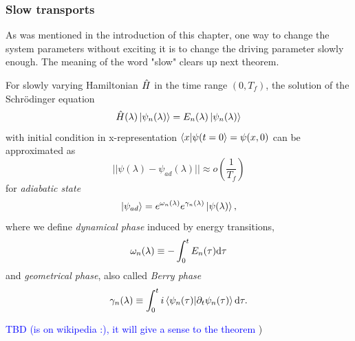 \subsubsection{Slow transports}
As was mentioned in the introduction of this chapter, one way to change the system parameters without exciting it is to change the driving parameter slowly enough. The meaning of the word "slow" clears up next theorem.
\begin{thm}
    \label{adiabaticTheorem}
    For slowly varying Hamiltonian $\hat{H}$ in the time range $(0,T_f)$, the solution of the Schrödinger equation 
    $$\hat{H}(\lambda)\ket{\psi_n(\lambda)} = E_n(\lambda)\ket{\psi_n(\lambda)}$$
    with initial condition in x-representation $\braket{x|\psi(t=0}=\psi(x,0)$ can be approximated as
    \begin{equation}
      ||\psi(\lambda) - \psi_{ad}(\lambda)||\approx o\left(\frac{1}{T_f}\right)
    \end{equation}
    for \emph{adiabatic state}
    \begin{equation}
        \ket{\psi_{ad}}= e^{\omega_n(\lambda)}e^{\gamma_n(\lambda)}\ket{\psi(\lambda)},
    \end{equation}
    where we define \emph{dynamical phase} induced by energy transitions,
    $$\omega_n(\lambda)\equiv -\int_0^t E_n(\tau)\mathrm{d} \tau$$
    and \emph{geometrical phase}, also called \emph{Berry phase}
        $$\gamma_n(\lambda)\equiv \int_0^t i\braket{\psi_n(\tau)|\partial_t\psi_n(\tau)} \mathrm{d} \tau .$$
\end{thm}
\begin{myproof}
    \textcolor{blue}{TBD (is on wikipedia :), it will give a sense to the theorem} )
\end{myproof}














\subsection{}

